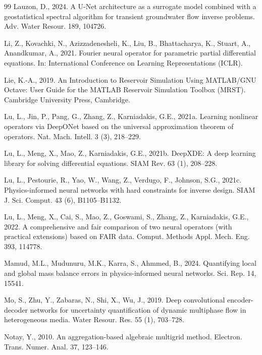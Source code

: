 \documentclass[preprint,12pt,authoryear]{elsarticle}
\begin{document}
\begin{thebibliography}{99}
Lauzon, D., 2024. A U-Net architecture as a surrogate model combined with a geostatistical spectral algorithm for transient groundwater flow inverse problems. Adv. Water Resour. 189, 104726.

Li, Z., Kovachki, N., Azizzadenesheli, K., Liu, B., Bhattacharya, K., Stuart, A., Anandkumar, A., 2021. Fourier neural operator for parametric partial differential equations. In: International Conference on Learning Representations (ICLR).

Lie, K.-A., 2019. An Introduction to Reservoir Simulation Using MATLAB/GNU Octave: User Guide for the MATLAB Reservoir Simulation Toolbox (MRST). Cambridge University Press, Cambridge.

Lu, L., Jin, P., Pang, G., Zhang, Z., Karniadakis, G.E., 2021a. Learning nonlinear operators via DeepONet based on the universal approximation theorem of operators. Nat. Mach. Intell. 3 (3), 218--229.

Lu, L., Meng, X., Mao, Z., Karniadakis, G.E., 2021b. DeepXDE: A deep learning library for solving differential equations. SIAM Rev. 63 (1), 208--228.

Lu, L., Pestourie, R., Yao, W., Wang, Z., Verdugo, F., Johnson, S.G., 2021c. Physics-informed neural networks with hard constraints for inverse design. SIAM J. Sci. Comput. 43 (6), B1105--B1132.

Lu, L., Meng, X., Cai, S., Mao, Z., Goswami, S., Zhang, Z., Karniadakis, G.E., 2022. A comprehensive and fair comparison of two neural operators (with practical extensions) based on FAIR data. Comput. Methods Appl. Mech. Eng. 393, 114778.

Mamud, M.L., Mudunuru, M.K., Karra, S., Ahmmed, B., 2024. Quantifying local and global mass balance errors in physics-informed neural networks. Sci. Rep. 14, 15541.

Mo, S., Zhu, Y., Zabaras, N., Shi, X., Wu, J., 2019. Deep convolutional encoder-decoder networks for uncertainty quantification of dynamic multiphase flow in heterogeneous media. Water Resour. Res. 55 (1), 703--728.

Notay, Y., 2010. An aggregation-based algebraic multigrid method. Electron. Trans. Numer. Anal. 37, 123--146.


\end{thebibliography}
\end{document}
